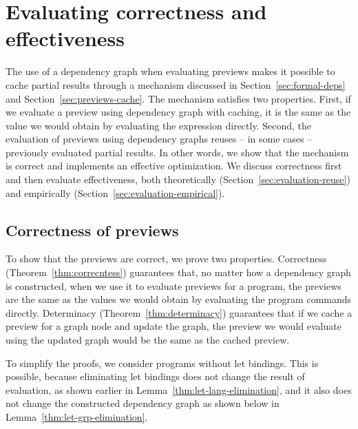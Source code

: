 \documentclass[acmsmall,anonymous,fleqn]{acmart}\settopmatter{printfolios=false,printccs=false,printacmref=false}
\theoremstyle{plain}
\theoremstyle{definition}
\begin{document}

\section{Evaluating correctness and effectiveness}
\label{sec:evaluation}

The use of a dependency graph when evaluating previews makes it possible to cache partial results
through a mechanism discussed in Section~\ref{sec:formal-deps} and Section~\ref{sec:previews-cache}.
The mechanism satisfies two properties. First, if we evaluate a preview using dependency
graph with caching, it is the same as the value we would obtain by evaluating the expression
directly. Second, the evaluation of previews using dependency graphs reuses -- in some cases --
previously evaluated partial results. In other words, we show that the mechanism is correct
and implements an effective optimization. We discuss correctness first and then evaluate
effectiveness, both theoretically (Section~\ref{sec:evaluation-reuse}) and empirically
(Section~\ref{sec:evaluation-empirical}).


\subsection{Correctness of previews}
\label{sec:evaluation-correctness}

To show that the previews are correct, we prove two properties. Correctness
(Theorem~\ref{thm:correcntess}) guarantees that, no matter how a dependency graph is constructed,
when we use it to evaluate previews for a program, the previews are the same as the values we
would obtain by evaluating the program commands directly. Determinacy (Theorem~\ref{thm:determinacy})
guarantees that if we cache a preview for a graph node and update the graph, the preview we would
evaluate using the updated graph would be the same as the cached preview.

To simplify the proofs, we consider programs without let bindings. This is possible, because
eliminating let bindings does not change the result of evaluation, as shown earlier in
Lemma~\ref{thm:let-lang-elimination}, and it also does not change the constructed dependency graph
as shown below in Lemma~\ref{thm:let-grp-elimination}.
\end{document}
